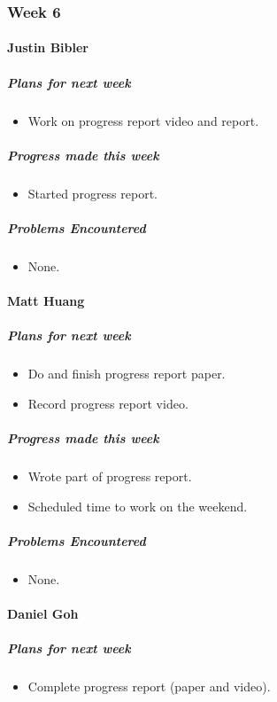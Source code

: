 {
\subsubsection{Week 6}
\paragraph{Justin Bibler}
\subparagraph{Plans for next week}
\begin{itemize}
  \item Work on progress report video and report.
\end{itemize}

\subparagraph{Progress made this week}
\begin{itemize}
  \item Started progress report.
\end{itemize}

\subparagraph{Problems Encountered}
\begin{itemize}
  \item None.
\end{itemize}
\vspace{3mm}

\paragraph{Matt Huang}
\subparagraph{Plans for next week}
\begin{itemize}
  \item Do and finish progress report paper.
  \item Record progress report video.
\end{itemize}

\subparagraph{Progress made this week}
\begin{itemize}
  \item Wrote part of progress report.
  \item Scheduled time to work on the weekend.
\end{itemize}

\subparagraph{Problems Encountered}
\begin{itemize}
  \item None.
\end{itemize}

\vspace{3mm}
\paragraph{Daniel Goh}
\subparagraph{Plans for next week}
\begin{itemize}
  \item Complete progress report (paper and video).
\end{itemize}

}
